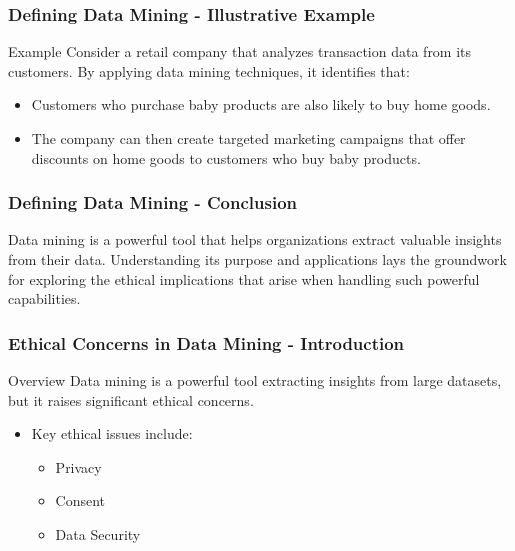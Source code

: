 \documentclass{beamer}
\begin{document}
\begin{frame}[fragile]
    \frametitle{Defining Data Mining - Illustrative Example}
    \begin{block}{Example}
        Consider a retail company that analyzes transaction data from its customers. By applying data mining techniques, it identifies that:
        \begin{itemize}
            \item Customers who purchase baby products are also likely to buy home goods.
            \item The company can then create targeted marketing campaigns that offer discounts on home goods to customers who buy baby products.
        \end{itemize}
    \end{block}
\end{frame}

\begin{frame}[fragile]
    \frametitle{Defining Data Mining - Conclusion}
    Data mining is a powerful tool that helps organizations extract valuable insights from their data. Understanding its purpose and applications lays the groundwork for exploring the ethical implications that arise when handling such powerful capabilities.
\end{frame}

\begin{frame}[fragile]
    \frametitle{Ethical Concerns in Data Mining - Introduction}
    \begin{block}{Overview}
        Data mining is a powerful tool extracting insights from large datasets, but it raises significant ethical concerns.
    \end{block}
    \begin{itemize}
        \item Key ethical issues include:
        \begin{itemize}
            \item Privacy
            \item Consent
            \item Data Security
        \end{itemize}
    \end{itemize}
\end{frame}
\end{document}
